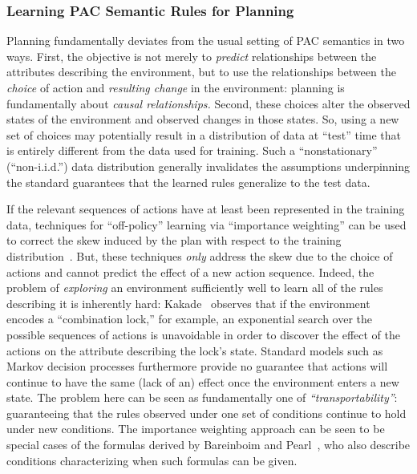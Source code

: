 \documentclass[12pt]{article}
\begin{document}
\subsubsection{Learning PAC Semantic Rules for Planning}
Planning fundamentally deviates from the usual setting of PAC semantics in two ways. First, the objective is not merely to {\em predict} relationships between the attributes describing the environment, but to use the relationships between the {\em choice} of action and {\em resulting change} in the environment: planning is fundamentally about {\em causal relationships.} Second, these choices alter the observed states of the environment and observed changes in those states. So, using a new set of choices may potentially result in a distribution of data at ``test'' time that is entirely different from the data used for training. Such a ``nonstationary'' (``non-i.i.d.'') data distribution generally invalidates the assumptions underpinning the standard guarantees that the learned rules generalize to the test data.

If the relevant sequences of actions have at least been represented in the training data, techniques for ``off-policy'' learning via ``importance weighting'' can be used to correct the skew induced by the plan with respect to the training distribution~\cite{precup2000off-policy,precup2001off-policy,shelton2001,peshkin2001,peshkin2002,uchibe2004,wawrzynski2009,hachiya2009,hachiya2011,juba2016jmlr}. But, these techniques {\em only} address the skew due to the choice of actions and cannot predict the effect of a new action sequence. Indeed, the problem of {\em exploring} an environment sufficiently well to learn all of the rules describing it is inherently hard: Kakade~\cite[Section~8.6]{kakade2003thesis} observes that if the environment encodes a ``combination lock,'' for example, an exponential search over the possible sequences of actions is unavoidable in order to discover the effect of the actions on the attribute describing the lock's state. Standard models such as Markov decision processes furthermore provide no guarantee that actions will continue to have the same (lack of an) effect once the environment enters a new state. The problem here can be seen as fundamentally one of {\em ``transportability''}: guaranteeing that the rules observed under one set of conditions continue to hold under new conditions. The importance weighting approach can be seen to be special cases of the formulas derived by Bareinboim and Pearl~\cite{bareinboim2012completeness,bareinboim2013algorithm}, who also describe conditions characterizing when such formulas can be given.
\end{document}
